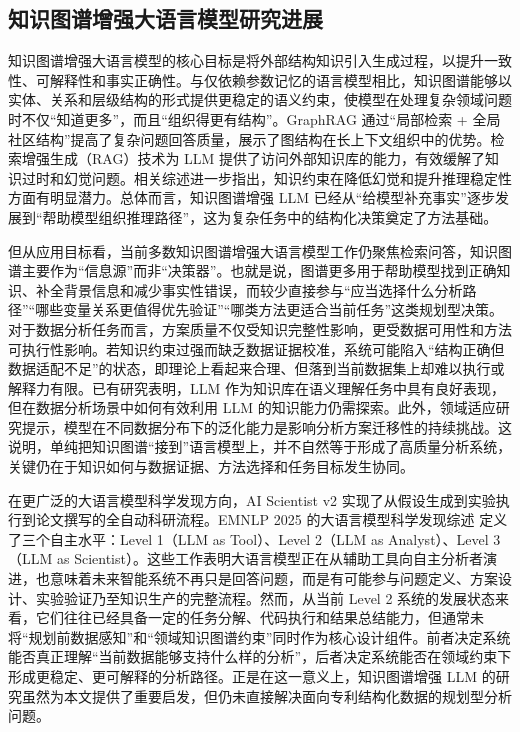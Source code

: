 \subsection{知识图谱增强大语言模型研究进展}

知识图谱增强大语言模型的核心目标是将外部结构知识引入生成过程，以提升一致性、可解释性和事实正确性\cite{pan2024unifying,liu2016knowledge}。与仅依赖参数记忆的语言模型相比，知识图谱能够以实体、关系和层级结构的形式提供更稳定的语义约束，使模型在处理复杂领域问题时不仅“知道更多”，而且“组织得更有结构”。GraphRAG\cite{edge2024graphrag} 通过“局部检索 + 全局社区结构”提高了复杂问题回答质量，展示了图结构在长上下文组织中的优势。检索增强生成（RAG）技术\cite{gao2023retrieval}为 LLM 提供了访问外部知识库的能力，有效缓解了知识过时和幻觉问题。相关综述进一步指出，知识约束在降低幻觉\cite{ji2023survey,zhang2023siren}和提升推理稳定性方面有明显潜力\cite{zhou2024hypothesis}。总体而言，知识图谱增强 LLM 已经从“给模型补充事实”逐步发展到“帮助模型组织推理路径”，这为复杂任务中的结构化决策奠定了方法基础。

但从应用目标看，当前多数知识图谱增强大语言模型工作仍聚焦检索问答，知识图谱主要作为“信息源”而非“决策器”。也就是说，图谱更多用于帮助模型找到正确知识、补全背景信息和减少事实性错误，而较少直接参与“应当选择什么分析路径”“哪些变量关系更值得优先验证”“哪类方法更适合当前任务”这类规划型决策。对于数据分析任务而言，方案质量不仅受知识完整性影响，更受数据可用性和方法可执行性影响。若知识约束过强而缺乏数据证据校准，系统可能陷入“结构正确但数据适配不足”的状态，即理论上看起来合理、但落到当前数据集上却难以执行或解释力有限。已有研究表明，LLM 作为知识库在语义理解任务中具有良好表现\cite{kim2023language}，但在数据分析场景中如何有效利用 LLM 的知识能力仍需探索。此外，领域适应研究\cite{wu2024brief}提示，模型在不同数据分布下的泛化能力是影响分析方案迁移性的持续挑战。这说明，单纯把知识图谱“接到”语言模型上，并不自然等于形成了高质量分析系统，关键仍在于知识如何与数据证据、方法选择和任务目标发生协同。

在更广泛的大语言模型科学发现方向，AI Scientist v2\cite{yamada2025aiscientist} 实现了从假设生成到实验执行到论文撰写的全自动科研流程。EMNLP 2025 的大语言模型科学发现综述\cite{zheng2025automation} 定义了三个自主水平：Level 1（LLM as Tool）、Level 2（LLM as Analyst）、Level 3（LLM as Scientist）。这些工作表明大语言模型正在从辅助工具向自主分析者演进，也意味着未来智能系统不再只是回答问题，而是有可能参与问题定义、方案设计、实验验证乃至知识生产的完整流程。然而，从当前 Level 2 系统的发展状态来看，它们往往已经具备一定的任务分解、代码执行和结果总结能力，但通常未将“规划前数据感知”和“领域知识图谱约束”同时作为核心设计组件。前者决定系统能否真正理解“当前数据能够支持什么样的分析”，后者决定系统能否在领域约束下形成更稳定、更可解释的分析路径。正是在这一意义上，知识图谱增强 LLM 的研究虽然为本文提供了重要启发，但仍未直接解决面向专利结构化数据的规划型分析问题。

